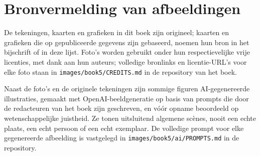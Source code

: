 \chapter*{Bronvermelding van afbeeldingen}

De tekeningen, kaarten en grafieken in dit boek zijn origineel; kaarten en grafieken
die op gepubliceerde gegevens zijn gebaseerd, noemen hun bron in het bijschrift of in
deze lijst. Foto's worden gebruikt onder hun respectievelijke vrije licenties, met
dank aan hun auteurs; volledige bronlinks en licentie-URL's voor elke foto staan in
\texttt{images/book5/CREDITS.md} in de repository van het boek.

\bigskip
Naast de foto's en de originele tekeningen zijn sommige figuren AI-gegenereerde
illustraties, gemaakt met OpenAI-beeldgeneratie op basis van prompts die door de
redacteuren van het boek zijn geschreven, en vóór opname beoordeeld op
wetenschappelijke juistheid. Ze tonen uitsluitend algemene scènes, nooit een echte
plaats, een echt persoon of een echt exemplaar. De volledige prompt voor elke
gegenereerde afbeelding is vastgelegd in \texttt{images/book5/ai/PROMPTS.md} in de
repository.

